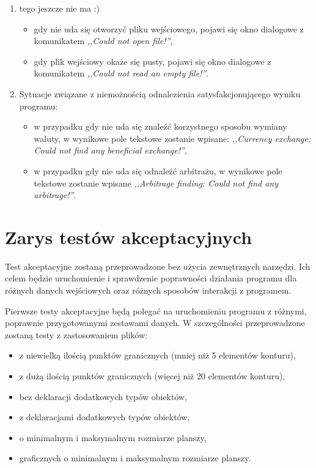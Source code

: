 \documentclass[a4paper,12pt]{article}
\newcommand\tab[1][0.6cm]{\hspace*{#1} }
\begin{document}
\begin{enumerate}
\item tego jeszcze nie ma :)
\begin{itemize}
\item gdy nie uda się otworzyć pliku wejściowego, pojawi się okno dialogowe z komunikatem \textit{,,Could not open file!''},
\item gdy plik wejściowy okaże się pusty, pojawi się okno dialogowe z komunikatem \textit{,,Could not read an empty file!''}.
\end{itemize}
\item Sytuacje związane z niemożnością odnalezienia satysfakcjonującego wyniku programu:
\begin{itemize}
\item w przypadku gdy nie uda się znaleźć korzystnego sposobu wymiany waluty, w wynikowe pole tekstowe zostanie wpisane: \textit{,,Currency exchange: Could not find any beneficial exchange!''},
\item w przypadku gdy nie uda się odnaleźć arbitrażu, w wynikowe pole tekstowe zostanie wpisane \textit{,,Arbitrage finding: Could not find any arbitrage!''}.
\end{itemize}
\end{enumerate}
\section{Zarys testów akceptacyjnych}

\tab Test akceptacyjne zostaną przeprowadzone bez użycia zewnętrznych narzędzi. Ich celem będzie uruchomienie i sprawdzenie poprawności działania programu dla różnych danych wejściowych oraz różnych sposobów interakcji z programem.

Pierwsze testy akceptacyjne będą polegać na uruchomieniu programu z różnymi, poprawnie przygotowanymi zestawami danych. W szczególności przeprowadzone zostaną testy z zastosowaniem plików:

\begin{itemize}
\item z niewielką ilością punktów granicznych (mniej niż 5 elementów konturu),
\item z dużą ilością punktów granicznych (więcej niż 20 elementów konturu),
\item bez deklaracji dodatkowych typów obiektów,
\item z deklaracjami dodatkowych typów obiektów,
\item o minimalnym i maksymalnym rozmiarze planszy,
\item graficznych o minimalnym i maksymalnym rozmiarze planszy.
\end{itemize}
\end{document}
